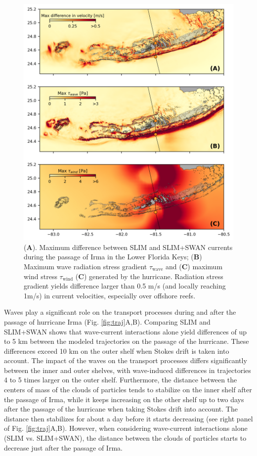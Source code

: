 \documentclass[preprint,12pt,authoryear]{elsarticle}
\begin{document}
\begin{figure}
    \centering
    \includegraphics[width=\textwidth]{fig/max_diff_reefs.png}
    \caption{(\textbf{A}). Maximum difference between SLIM and SLIM+SWAN currents during the passage of Irma in the Lower Florida Keys; (\textbf{B}) Maximum wave radiation stress gradient {\boldmath$\tau$}$_\text{wave}$ and (\textbf{C}) maximum wind stress {\boldmath$\tau$}$_\text{wind}$ (\textbf{C}) generated by the hurricane. Radiation stress gradient yields difference larger than 0.5 m/s (and locally reaching 1m/s) in current velocities, especially over offshore reefs.}
    \label{fig:diff}
\end{figure}

Waves play a significant role on the transport processes during and after the passage of hurricane Irma (Fig. \ref{fig:traj}A,B). Comparing SLIM and SLIM+SWAN shows that wave-current interactions alone yield differences of up to 5 km between the modeled trajectories on the passage of the hurricane. These differences exceed 10 km on the outer shelf when Stokes drift is taken into account. The impact of the waves on the transport processes differs significantly between the inner and outer shelves, with wave-induced differences in trajectories 4 to 5 times larger on the outer shelf. Furthermore, the distance between the centers of mass of the clouds of particles tends to stabilize on the inner shelf after the passage of Irma, while it keeps increasing on the other shelf up to two days after the passage of the hurricane when taking Stokes drift into account. The distance then stabilizes for about a day before it starts decreasing (see right panel of Fig. \ref{fig:traj}A,B). However, when considering wave-current interactions alone (SLIM vs. SLIM+SWAN), the distance between the clouds of particles starts to decrease just after the passage of Irma.
\end{document}

